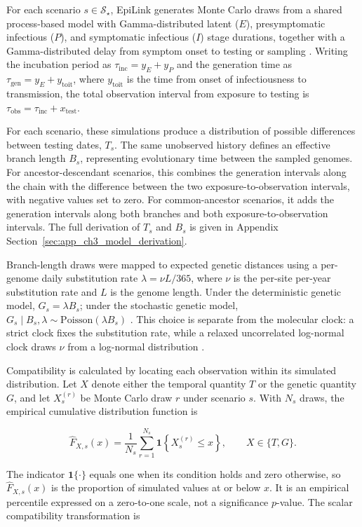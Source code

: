 For each scenario $s\in\mathcal{S}_\star$, EpiLink generates Monte Carlo draws from a shared process-based model with Gamma-distributed latent ($E$), presymptomatic infectious ($P$), and symptomatic infectious ($I$) stage durations, together with a Gamma-distributed delay from symptom onset to testing or sampling \citep{Hart2021,McAloon2020,Hart2022}. Writing the incubation period as $\tau_{\mathrm{inc}}=y_E+y_P$ and the generation time as $\tau_{\mathrm{gen}}=y_E+y_{\mathrm{toit}}$, where $y_{\mathrm{toit}}$ is the time from onset of infectiousness to transmission, the total observation interval from exposure to testing is $\tau_{\mathrm{obs}}=\tau_{\mathrm{inc}}+x_{\mathrm{test}}$.

For each scenario, these simulations produce a distribution of possible differences between testing dates, $T_s$. The same unobserved history defines an effective branch length $B_s$, representing evolutionary time between the sampled genomes. For ancestor-descendant scenarios, this combines the generation intervals along the chain with the difference between the two exposure-to-observation intervals, with negative values set to zero. For common-ancestor scenarios, it adds the generation intervals along both branches and both exposure-to-observation intervals. The full derivation of $T_s$ and $B_s$ is given in Appendix Section~\ref{sec:app_ch3_model_derivation}.

Branch-length draws were mapped to expected genetic distances using a per-genome daily substitution rate $\lambda=\nu L/365$, where $\nu$ is the per-site per-year substitution rate and $L$ is the genome length. Under the deterministic genetic model, $G_s=\lambda B_s$; under the stochastic genetic model, $G_s\mid B_s,\lambda\sim\mathrm{Poisson}(\lambda B_s)$ \citep{Jombart2010}. This choice is separate from the molecular clock: a strict clock fixes the substitution rate, while a relaxed uncorrelated log-normal clock draws $\nu$ from a log-normal distribution \citep{Drummond2006}.

Compatibility is calculated by locating each observation within its simulated distribution. Let $X$ denote either the temporal quantity $T$ or the genetic quantity $G$, and let $X_s^{(r)}$ be Monte Carlo draw $r$ under scenario $s$. With $N_s$ draws, the empirical cumulative distribution function is

\[
    \widehat F_{X,s}(x)
    = \frac{1}{N_s}\sum_{r=1}^{N_s} 
    \mathbf{1}\!\left\{X_s^{(r)}\le x\right\}, 
    \qquad X\in\{T,G\}.
\]

The indicator $\mathbf{1}\{\cdot\}$ equals one when its condition holds and zero otherwise, so $\widehat F_{X,s}(x)$ is the proportion of simulated values at or below $x$. It is an empirical percentile expressed on a zero-to-one scale, not a significance $p$-value. The scalar compatibility transformation is

